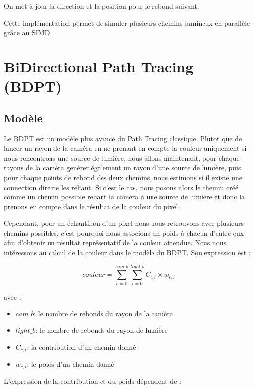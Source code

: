 On met à jour la direction et la position pour le rebond suivant.

\medskip

Cette implémentation permet de simuler plusieurs chemins lumineux en parallèle grâce au SIMD.


\section{BiDirectional Path Tracing (BDPT)}

\subsection{Modèle}

Le BDPT est un modèle plus avancé du Path Tracing classique. Plutot que de lancer un rayon de la caméra en ne prenant en compte la couleur uniquement si nous rencontrons une source de lumière, nous allons maintenant, pour chaque rayons de la caméra genérer également un rayon d'une source de lumière, puis pour chaque points de rebond des deux chemins, nous estimons si il existe une connection directe les reliant. Si c'est le cas, nous posons alors le chemin créé comme un chemin possible reliant la caméra à une source de lumière et donc la prenons en compte dans le résultat de la couleur du pixel.

\bdptbounce

Cependant, pour un échantillon d'un pixel nous nous retrouvons avec plusieurs chemins possibles, c'est pourquoi nous associons un poids à chacun d'entre eux afin d'obtenir un résultat représentatif de la couleur attendue. Nous nous intéressons au calcul de la couleur dans le modèle du BDPT. Son expression est :

$$
couleur = \sum_{c=0}^{cam\_b} \sum_{l=0}^{light\_b} C_{c,l} \times w_{c,l}
$$

avec :

\begin{itemize}
    \item $cam\_b$: le nombre de rebonds du rayon de la caméra
    \item $light\_b$: le nombre de rebonds du rayon de lumière
    \item $C_{c,l}$: la contribution d'un chemin donné
    \item $w_{c,l}$: le poids d'un chemin donné
\end{itemize}
\vspace{0.4cm}

L'expression de la contribution et du poids dépendent de :


